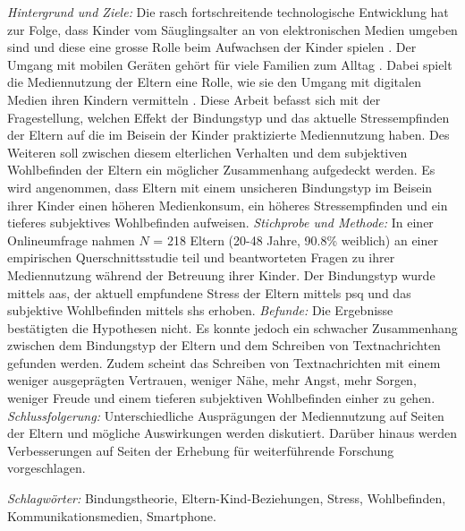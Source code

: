 \begin{flushleft}
\textit{Hintergrund und Ziele:} Die rasch fortschreitende technologische Entwicklung hat zur Folge, dass Kinder vom Säuglingsalter an von elektronischen Medien umgeben sind und diese eine grosse Rolle beim Aufwachsen der Kinder spielen \cite{Feierabend2015}. Der Umgang mit mobilen Geräten gehört für viele Familien zum Alltag \cite{Wagner2016}. Dabei spielt die Mediennutzung der Eltern eine Rolle, wie sie den Umgang mit digitalen Medien ihren Kindern vermitteln \cite{Livingstone2015a}. Diese Arbeit befasst sich mit der Fragestellung, welchen Effekt der Bindungstyp und das aktuelle Stressempfinden der Eltern auf die im Beisein der Kinder praktizierte Mediennutzung haben. Des Weiteren soll zwischen diesem elterlichen Verhalten und dem subjektiven Wohlbefinden der Eltern ein möglicher Zusammenhang aufgedeckt werden. Es wird angenommen, dass Eltern mit einem unsicheren Bindungstyp im Beisein ihrer Kinder einen höheren Medienkonsum, ein höheres Stressempfinden und ein tieferes subjektives Wohlbefinden aufweisen. \textit{Stichprobe und Methode:} In einer Online\-umfrage nahmen $N$ = 218 Eltern (20-48 Jahre, 90.8\% weiblich) an einer empirischen Querschnittsstudie teil und beantworteten Fragen zu ihrer Mediennutzung während der Betreuung ihrer Kinder. Der Bindungstyp wurde mittels \acrfull{aas}, der aktuell empfundene Stress der Eltern mittels \acrfull{psq} und das subjektive Wohlbefinden mittels \acrfull{shs} erhoben. 
\textit{Befunde:} Die Ergebnisse bestätigten die Hypothesen nicht. Es konnte jedoch ein schwacher Zusammenhang zwischen dem Bindungstyp der Eltern und dem Schreiben von Textnachrichten gefunden werden. Zudem scheint das Schreiben von Textnachrichten mit einem weniger ausgeprägten Vertrauen, weniger Nähe, mehr Angst, mehr Sorgen, weniger Freude und einem tieferen subjektiven Wohlbefinden einher zu gehen. 
\textit{Schlussfolgerung:} Unterschiedliche Ausprägungen der Mediennutzung auf Seiten der Eltern und mögliche Auswirkungen werden diskutiert. Darüber hinaus werden Verbesserungen auf Seiten der Erhebung für weiterführende Forschung vorgeschlagen. \linebreak


\textit{Schlagwörter:} Bindungstheorie, Eltern-Kind-Beziehungen, Stress, Wohlbefinden, Kommunikationsmedien, Smartphone.

\end{flushleft}
